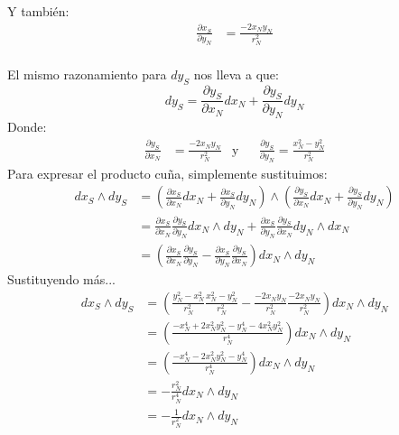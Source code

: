 \documentclass[11pt]{article}
\theoremstyle{definition}
\begin{document}
Y también:
\begin{equation*}
    \begin{split}
        \frac{\partial x_S}{\partial y_N}&=\frac{-2x_Ny_N}{r_N^2}
    \end{split}
\end{equation*}\\
El mismo razonamiento para $dy_S$ nos lleva a que:
\begin{equation*}
    dy_S=\frac{\partial y_S}{\partial x_N}dx_N+\frac{\partial y_S}{\partial y_N}dy_N
\end{equation*}
Donde:
\begin{align*}
        \frac{\partial y_S}{\partial x_N}&=\frac{-2x_N y_N}{r_N^2} & \text{y}& & \frac{\partial y_S}{\partial y_N}=\frac{x_N^2-y^2_N}{r_N^2}
\end{align*}
\newpage
Para expresar el producto cuña, simplemente sustituimos:
\begin{equation*}
    \begin{split}
        dx_S\wedge dy_S&=\left(\frac{\partial x_S}{\partial x_N}dx_N+\frac{\partial x_S}{\partial y_N}dy_N\right)\wedge\left(\frac{\partial y_S}{\partial x_N}dx_N+\frac{\partial y_S}{\partial y_N}dy_N\right)\\
        &=\frac{\partial x_S}{\partial x_N}\frac{\partial y_S}{\partial y_N}dx_N\wedge dy_N+\frac{\partial x_S}{\partial y_N}\frac{\partial y_S}{\partial x_N}dy_N\wedge dx_N\\
        &=\left(\frac{\partial x_S}{\partial x_N}\frac{\partial y_S}{\partial y_N}-\frac{\partial x_S}{\partial y_N}\frac{\partial y_S}{\partial x_N}\right)dx_N\wedge dy_N
    \end{split}
\end{equation*}
Sustituyendo más...
\begin{equation*}
    \begin{split}
        dx_S\wedge dy_S&=\left( \frac{y_N^2-x_N^2}{r_N^2}\frac{x_N^2-y^2_N}{r_N^2}-\frac{-2x_Ny_N}{r_N^2}\frac{-2x_Ny_N}{r_N^2}\right)dx_N\wedge dy_N\\
        &=\left(\frac{-x^4_N+2x^2_Ny^2_N-y^4_N-4x^2_Ny^2_N}{r^4_N}\right)dx_N\wedge dy_N\\
        &=\left(\frac{-x^4_N-2x^2_Ny^2_N-y^4_N}{r^4_N}\right)dx_N\wedge dy_N\\
        &=-\frac{r_N^2}{r_N^4}dx_N\wedge dy_N\\
        &=-\frac{1}{r_N^2}dx_N\wedge dy_N\\
    \end{split}
\end{equation*}
\end{document}
